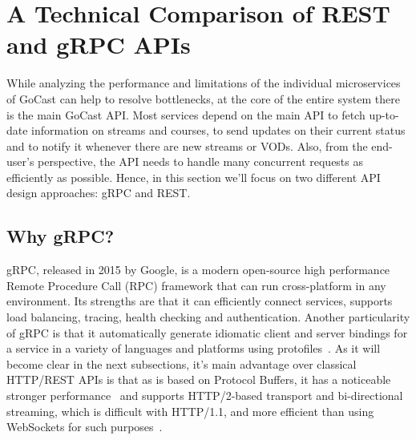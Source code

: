 


\section{A Technical Comparison of REST and gRPC APIs}

While analyzing the performance and limitations of the individual microservices of GoCast can help to resolve bottlenecks, at the core of the entire system there is the main GoCast \ac{API}.
Most services depend on the main \ac{API} to fetch up-to-date information on streams and courses, to send updates on their current status and to notify it whenever there are new streams or \ac{VOD}s. Also, from the end-user's perspective, the \ac{API} needs to handle many concurrent requests as efficiently as possible. Hence, in this section we'll focus on two different \ac{API} design approaches: \ac{gRPC} and \ac{REST}.

\subsection{Why gRPC?}

\ac{gRPC}, released in 2015 by Google, is a modern open-source high performance Remote Procedure Call (RPC) framework that can run cross-platform in any environment. Its strengths are that it can efficiently connect services, supports load balancing, tracing, health checking and authentication.
Another particularity of \ac{gRPC} is that it automatically generate idiomatic client and server bindings for a service in a variety of languages and platforms using protofiles~\parencite{grpc_vs_rest}.
As it will become clear in the next subsections, it's main advantage over classical HTTP/\ac{REST} \ac{API}s is that as is based on Protocol Buffers, it has a noticeable stronger performance~\parencite{grpc_vs_rest_2} and supports HTTP/2-based transport and bi-directional streaming, which is difficult with HTTP/1.1, and more efficient than using WebSockets for such purposes~\parencite{grpc_dev}.

